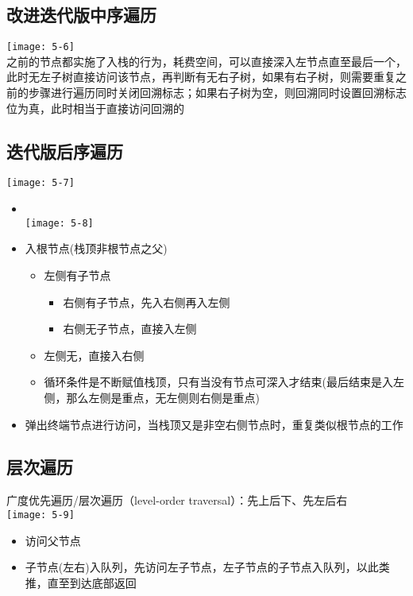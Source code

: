 
\subsection{改进迭代版中序遍历}
\texttt{[image: 5-6]}\\
之前的节点都实施了入栈的行为，耗费空间，可以直接深入左节点直至最后一个，此时无左子树直接访问该节点，再判断有无右子树，如果有右子树，则需要重复之前的步骤进行遍历同时关闭回溯标志；如果右子树为空，则回溯同时设置回溯标志位为真，此时相当于直接访问回溯的

\subsection{迭代版后序遍历}
\texttt{[image: 5-7]}\\
\begin{itemize}
\item ~\\\texttt{[image: 5-8]}
\item 入根节点(栈顶非根节点之父)
\begin{itemize}
\item 左侧有子节点
\begin{itemize}
\item 右侧有子节点，先入右侧再入左侧
\item 右侧无子节点，直接入左侧
\end{itemize}
\item 左侧无，直接入右侧
\item 循环条件是不断赋值栈顶，只有当没有节点可深入才结束(最后结束是入左侧，那么左侧是重点，无左侧则右侧是重点)
\end{itemize}
\item 弹出终端节点进行访问，当栈顶又是非空右侧节点时，重复类似根节点的工作
\end{itemize}

\subsection{层次遍历}
广度优先遍历/层次遍历（level-order traversal）：先上后下、先左后右
\\\texttt{[image: 5-9]}
\begin{itemize}
\item 访问父节点
\item 子节点(左右)入队列，先访问左子节点，左子节点的子节点入队列，以此类推，直至到达底部返回
\end{itemize}

